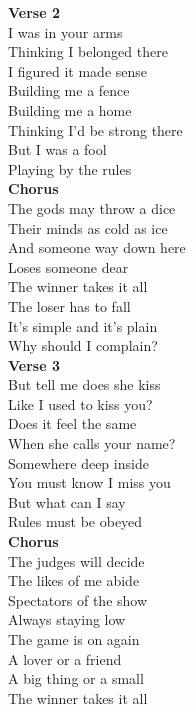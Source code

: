 \documentclass[a4paper]{article}
\begin{document}
{\begin{multicols}
{            }
            \textbf{Verse 2}
            ~\\
            {
                \cutive
                \obeyspaces
I was in your arms
\\
Thinking I belonged there
\\
I figured it made sense
\\
Building me a fence
\\
Building me a home
\\
Thinking I'd be strong there
\\
But I was a fool
\\
Playing by the rules
\\

            }
            \textbf{Chorus}
            ~\\
            {
                \cutive
                \obeyspaces
The gods may throw a dice
\\
Their minds as cold as ice
\\
And someone way down here
\\
Loses someone dear
\\
The winner takes it all
\\
The loser has to fall
\\
It's simple and it's plain
\\
Why should I complain?
\\

            }
            \textbf{Verse 3}
            ~\\
            {
                \cutive
                \obeyspaces
But tell me does she kiss
\\
Like I used to kiss you?
\\
Does it feel the same
\\
When she calls your name? 
\\
Somewhere deep inside
\\
You must know I miss you
\\
But what can I say
\\
Rules must be obeyed
\\

            }
            \textbf{Chorus}
            ~\\
            {
                \cutive
                \obeyspaces
The judges will decide
\\
The likes of me abide
\\
Spectators of the show
\\
Always staying low
\\
The game is on again
\\
A lover or a friend
\\
A big thing or a small
\\
The winner takes it all
\\

}
\end{multicols}}
\end{document}
